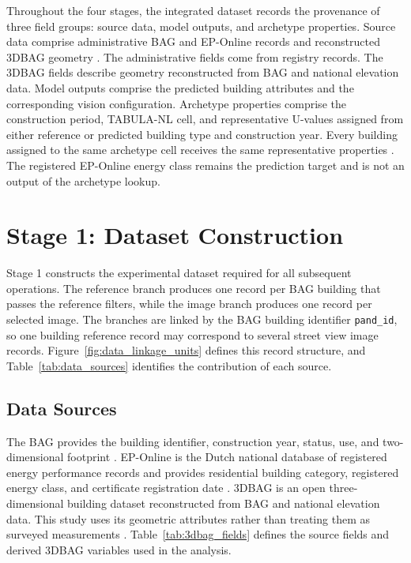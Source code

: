 Throughout the four stages, the integrated dataset records the provenance of three field groups: source data, model outputs, and archetype properties.
Source data comprise administrative \acs{BAG} and EP-Online records and reconstructed 3DBAG geometry \parencite{kadasterbag,rvoeponline,threedbagdocs,peters2022,dukai2021}.
The administrative fields come from registry records. The 3DBAG fields describe geometry reconstructed from \acs{BAG} and national elevation data.
Model outputs comprise the predicted building attributes and the corresponding vision configuration.
Archetype properties comprise the construction period, TABULA-NL cell, and representative U-values assigned from either reference or predicted building type and construction year.
Every building assigned to the same archetype cell receives the same representative properties \parencite{loga2016,tabulawebtool}.
The registered EP-Online energy class remains the prediction target and is not an output of the archetype lookup.

\section{Stage 1: Dataset Construction}
\label{sec:dataset_construction}

Stage 1 constructs the experimental dataset required for all subsequent operations.
The reference branch produces one record per \acs{BAG} building that passes the reference filters, while the image branch produces one record per selected image.
The branches are linked by the \acs{BAG} building identifier \texttt{pand\_id}, so one building reference record may correspond to several street view image records.
Figure~\ref{fig:data_linkage_units} defines this record structure, and Table~\ref{tab:data_sources} identifies the contribution of each source.

\subsection{Data Sources}
\label{sec:data_sources}

The \acs{BAG} provides the building identifier, construction year, status, use, and two-dimensional footprint \parencite{kadasterbag}.
EP-Online is the Dutch national database of registered energy performance records and provides residential building category, registered energy class, and certificate registration date \parencite{rvoeponline}.
3DBAG is an open three-dimensional building dataset reconstructed from \acs{BAG} and national elevation data.
This study uses its geometric attributes rather than treating them as surveyed measurements \parencite{threedbagdocs,peters2022,dukai2021}.
Table~\ref{tab:3dbag_fields} defines the source fields and derived 3DBAG variables used in the analysis.

